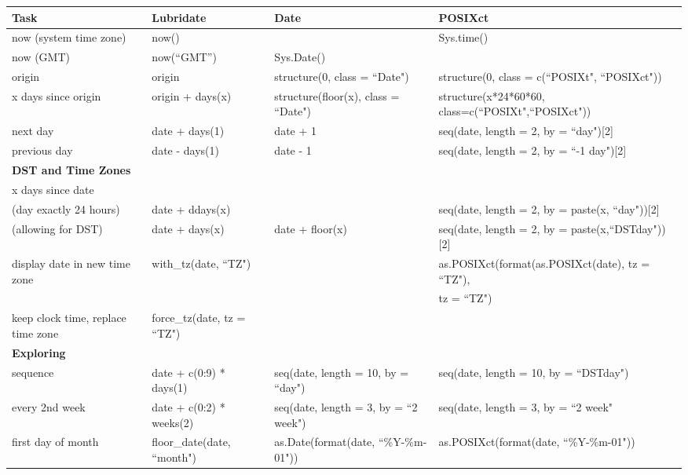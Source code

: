 \documentclass[article]{jss}
\begin{document}
\begin{table}

\begin{center}
\scriptsize
\begin{tabular}{llll}
\toprule
\bf{Task} & \bf{Lubridate} & \bf{Date}  & \bf{POSIXct} \\
\midrule
now (system time zone)  & now() & & Sys.time()\\
now (GMT)  & now(``GMT'') & Sys.Date() &\\
origin  & origin & structure(0, class = ``Date") & structure(0, class = c(``POSIXt", ``POSIXct"))\\
x days since origin  & origin + days(x) & structure(floor(x), class = ``Date") & structure(x*24*60*60, class=c(``POSIXt",``POSIXct"))\\
next day  & date + days(1) & date + 1 & seq(date, length = 2, by = ``day")[2]\\
previous day  & date - days(1) & date - 1 & seq(date, length = 2, by = ``-1 day")[2]\\
\midrule
\bf{DST and Time Zones} & & &\\
\cmidrule{1-1}
x days since date & & & \\
\hspace{6mm} (day exactly 24 hours) & date + ddays(x) & & seq(date, length = 2, by = paste(x, ``day"))[2]\\
\hspace{6mm} (allowing for DST) & date + days(x) & date + floor(x) & seq(date, length = 2, by = paste(x,``DSTday"))[2]\\
display date in new time zone & with\_tz(date, ``TZ") & & as.POSIXct(format(as.POSIXct(date), tz = ``TZ"),\\
& & & \hspace{3mm}  tz = ``TZ")\\
keep clock time, replace time zone & force\_tz(date, tz = ``TZ") & &\\
\midrule
\bf{Exploring} & & & \\
\cmidrule{1-1}
sequence & date + c(0:9) * days(1) & seq(date, length = 10, by = ``day") & seq(date, length = 10, by = ``DSTday") \\ 
every 2nd week & date + c(0:2) * weeks(2) & seq(date, length = 3, by = ``2 week") & seq(date, length = 3, by = ``2 week"\\
first day of month & floor\_date(date, ``month") & as.Date(format(date, ``\%Y-\%m-01")) & as.POSIXct(format(date, ``\%Y-\%m-01"))\\

\end{tabular}
\end{center}
\end{table}
\end{document}
